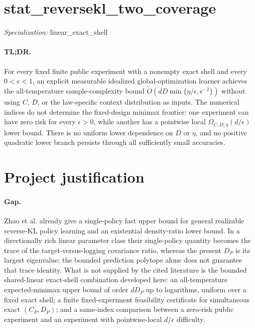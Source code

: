 \documentclass{article}
\begin{document}
\sloppy

\section*{stat\_\allowbreak{}reversekl\_\allowbreak{}two\_\allowbreak{}coverage}

\noindent\textit{Specialization:} linear\_\allowbreak{}exact\_\allowbreak{}shell\par

\paragraph{TL;DR.} For every fixed finite public experiment with a nonempty exact shell and every \(0<\epsilon<1\), an explicit measurable idealized global-optimization learner achieves the all-temperature sample-complexity bound \(\widetilde O\!\left(dD\min\{\eta/\epsilon,\epsilon^{-2}\}\right)\) without using \(C\), \(D\), or the law-specific context distribution as inputs. The numerical indices do not determine the fixed-design minimax frontier: one experiment can have zero risk for every \(\epsilon>0\), while another has a pointwise local \(\Omega_{C,D,\eta}(d/\epsilon)\) lower bound. There is no uniform lower dependence on \(D\) or \(\eta\), and no positive quadratic lower branch persists through all sufficiently small accuracies.

\section{Project justification}

\paragraph{Gap.} Zhao et al. already give a single-policy fast upper bound for general realizable reverse-KL policy learning and an existential density-ratio lower bound. In a directionally rich linear parameter class their single-policy quantity becomes the trace of the target-versus-logging covariance ratio, whereas the present \(D_P\) is its largest eigenvalue; the bounded prediction polytope alone does not guarantee that trace identity. What is not supplied by the cited literature is the bounded shared-linear exact-shell combination developed here: an all-temperature expected-minimax upper bound of order \(dD_P\) up to logarithms, uniform over a fixed exact shell; a finite fixed-experiment feasibility certificate for simultaneous exact \((C_P,D_P)\); and a same-index comparison between a zero-risk public experiment and an experiment with pointwise-local \(d/\epsilon\) difficulty.
\end{document}
